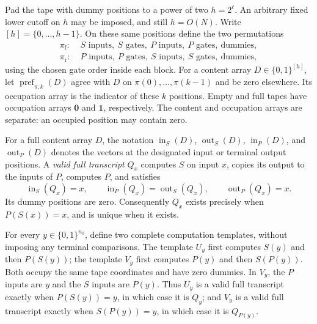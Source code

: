 Pad the tape with dummy positions to a power of two $h=2^\ell$.
An arbitrary fixed lower cutoff on $h$ may be imposed, and still
$h=O(N)$.  Write $[h]=\{0,\ldots,h-1\}$.  On these same positions define
the two permutations
\begin{align*}
 \pi_{\mathrm f}:\;&S\text{ inputs},\ S\text{ gates},\
 P\text{ inputs},\ P\text{ gates},\ \text{dummies},\\
 \pi_{\mathrm r}:\;&P\text{ inputs},\ P\text{ gates},\
 S\text{ inputs},\ S\text{ gates},\ \text{dummies},
\end{align*}
using the chosen gate order inside each block.  For a content array
$D\in\{0,1\}^{[h]}$, let $\operatorname{pref}_{\pi,k}(D)$ agree with
$D$ on $\pi(0),\ldots,\pi(k-1)$ and be zero elsewhere.  Its occupation
array is the indicator of these $k$ positions.  Empty and full tapes
have occupation arrays $\mathbf 0$ and $\mathbf 1$, respectively.
The content and occupation arrays are separate: an occupied position
may contain zero.

For a full content array $D$, the notation
$\operatorname{in}_S(D)$, $\operatorname{out}_S(D)$,
$\operatorname{in}_P(D)$, and $\operatorname{out}_P(D)$ denotes the
vectors at the designated input or terminal output positions.  A
\emph{valid full transcript} $Q_x$ computes $S$ on input $x$, copies
its output to the inputs of $P$, computes $P$, and satisfies
\begin{equation}\label{macro:full-transcript}
 \operatorname{in}_S(Q_x)=x,\qquad
 \operatorname{in}_P(Q_x)=\operatorname{out}_S(Q_x),\qquad
 \operatorname{out}_P(Q_x)=x.
\end{equation}
Its dummy positions are zero.  Consequently $Q_x$ exists precisely
when $P(S(x))=x$, and is unique when it exists.

For every $y\in\{0,1\}^{n_0}$, define two complete computation templates,
without imposing any terminal comparisons.  The template $U_y$ first
computes $S(y)$ and then $P(S(y))$; the template $V_y$ first computes
$P(y)$ and then $S(P(y))$.  Both occupy the same tape coordinates and
have zero dummies.  In $V_y$, the $P$ inputs are $y$ and the $S$ inputs
are $P(y)$.  Thus $U_y$ is a valid full transcript exactly when
$P(S(y))=y$, in which case it is $Q_y$; and $V_y$ is a valid full
transcript exactly when $S(P(y))=y$, in which case it is $Q_{P(y)}$.

